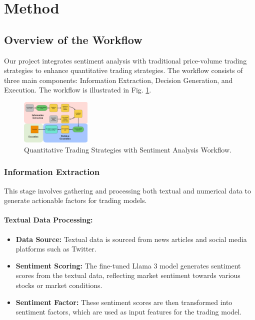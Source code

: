 \documentclass[conference]{IEEEtran}
\begin{document}
\section{\textbf{Method}}
\subsection{\textbf{Overview of the Workflow}}

Our project integrates sentiment analysis with traditional price-volume trading strategies to enhance quantitative trading strategies.
The workflow consists of three main components: Information Extraction, Decision Generation, and Execution. 
The workflow is illustrated in Fig. \ref{fig:workflow}.

\begin{figure}[htbp]
    \centering
    \includegraphics[width=0.3\textwidth]{workflow.jpg}
    \caption{Quantitative Trading Strategies with Sentiment Analysis Workflow.}
    \label{fig:workflow}
\end{figure}

\subsubsection{Information Extraction}

This stage involves gathering and processing both textual and numerical data to generate actionable factors for trading models.

\paragraph{Textual Data Processing:}
\begin{itemize}
    \item \textbf{Data Source:} Textual data is sourced from news articles and social media platforms such as Twitter.
    \item \textbf{Sentiment Scoring:} The fine-tuned Llama 3 model generates sentiment scores from the textual data, reflecting market sentiment towards various stocks or market conditions.
    \item \textbf{Sentiment Factor:} These sentiment scores are then transformed into sentiment factors, which are used as input features for the trading model.
\end{itemize}
\end{document}
